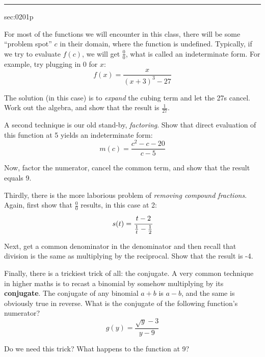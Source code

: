 \renewcommand{\columnseprule}{1.5pt}
\begin{multicols*}{2}
\rule[0.5\baselineskip]{0.4\textwidth}{1pt}
\noindent
{}\label{sec:0201p}
\begin{exercises}{sec:0201p}

\lab{} For most of the functions we will encounter in this class, there will be some 
``problem spot'' $c$ in their domain, where the function is undefined.  Typically, if 
we try to evaluate $f(c)$, we will get $\frac{0}{0}$, what is called an 
\gls{indeterminate form}.  For example, try plugging in 0 for $x$:
$$
f(x)=\frac{x}{(x+3)^3-27}
$$

\vspace{1cm}
\lab{} The solution (in this case) is to \emph{expand} the cubing term and let the 27s cancel.  
Work out the algebra, and show that the result
is $\frac{1}{27}$.

\vspace{2cm}
\lab{} A second technique is our old stand-by, \emph{factoring}.  Show that direct 
evaluation of this function at 5 yields an indeterminate form:
$$
m(c) = \frac{c^2-c-20}{c-5}
$$

\vspace{1cm}
\lab{}  Now, factor the numerator, cancel the common term, and show that the result equals 9.

\vspace{2cm}
\lab{} Thirdly, there is the more laborious problem of \emph{removing compound fractions}.  
Again, first show that $\frac{0}{0}$ results, in this case at 2:
$$
s(t)=\cfrac{t-2}{\frac{1}{t}-\frac{1}{2}}
$$

\vspace{1cm}
\lab{}  Next, get a common denominator in the denominator and then recall that division is the 
same as multiplying by the reciprocal.  Show that the result is -4.

\vspace{2cm}
\lab{} Finally, there is a trickiest trick of all: the conjugate.  A very common technique in 
higher maths is to recast a binomial by somehow multiplying by its \textbf{conjugate}.  
 The conjugate of any binomial $a+b$ is $a-b$, and the same is obviously
true in reverse.  What is the conjugate of the following function's numerator?
$$
g(y) = \frac{\sqrt{y}-3}{y-9}
$$

\vspace{1cm}
\lab{}  Do we need this trick?  What happens to the function at 9?


\end{exercises}
\end{multicols*}
